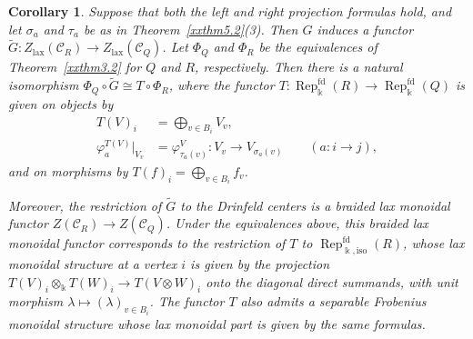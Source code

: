 \documentclass{amsart}
\newtheorem{corollary}[theorem]{Corollary}
\theoremstyle{definition}
\theoremstyle{remark}
\numberwithin{equation}{section}
\begin{document}
\begin{corollary}\label{xxcor5.4}
Suppose that both the left and right projection formulas hold, and let
$\sigma_a$ and $\tau_a$ be as in
Theorem~\ref{xxthm5.2}\textup{(3)}.
Then $G$ induces a functor
$\widetilde G\colon Z_{\mathrm{lax}}(\mathcal C_R)\to
Z_{\mathrm{lax}}(\mathcal C_Q)$.
Let $\Phi_Q$ and $\Phi_R$ be the equivalences of
Theorem~\ref{xxthm3.2} for $Q$ and $R$,
respectively.
Then there is a natural isomorphism
$\Phi_Q\circ\widetilde G\cong T\circ\Phi_R$, where the functor
$T\colon\operatorname{Rep}^{\mathrm{fd}}_{\Bbbk}(R)\to
\operatorname{Rep}^{\mathrm{fd}}_{\Bbbk}(Q)$
is given on objects by
\begin{align}
T(V)_i
&=
\bigoplus_{v\in B_i}V_v,
\label{xxeq5-8}\\
\varphi_a^{T(V)}\big|_{V_v}
&=
\varphi^V_{\tau_a(v)}\colon
V_v
\longrightarrow
V_{\sigma_a(v)}
\qquad
(a\colon i\to j),
\label{xxeq5-9}
\end{align}
and on morphisms by $T(f)_i=\bigoplus_{v\in B_i}f_v$.

Moreover, the restriction of $\widetilde G$ to the Drinfeld centers is a braided lax
monoidal functor $Z(\mathcal C_R)\to Z(\mathcal C_Q)$.
Under the equivalences above, this braided lax monoidal functor corresponds
to the restriction of $T$ to
$\operatorname{Rep}^{\mathrm{fd}}_{\Bbbk,\mathrm{iso}}(R)$, whose lax monoidal
structure at a vertex $i$ is given by the projection
$T(V)_i\otimes_{\Bbbk}T(W)_i\to T(V\otimes W)_i$ onto the diagonal direct
summands, with unit morphism $\lambda\mapsto(\lambda)_{v\in B_i}$.
The functor $T$ also admits a separable Frobenius monoidal structure whose
lax monoidal part is given by the same formulas.
\end{corollary}
\end{document}
